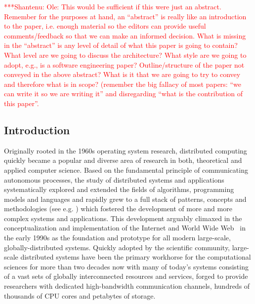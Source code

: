 \documentclass[a4paper,10pt]{article}
\newcommand{\jhanote}[1]{  {\textcolor{red}     { ***Shantenu: #1 }}}
\newcommand{\jhanote}[1]{}
\begin{document}
\jhanote{Ole: This would be sufficient if this were just an
  abstract. Remember for the purposes at hand, an ``abstract'' is
  really like an introduction to the paper, i.e. enough material so
  the editors can provide useful comments/feedback so that we can make
  an informed decision. What is missing in the ``abstract'' is any
  level of detail of what this paper is going to contain? What level
  are we going to discuss the architecture? What style are we going to
  adopt, e.g., is a software engineering paper?  Outline/structure of
  the paper not conveyed in the above abstract? What is it that we are
  going to try to convey and therefore what is in scope? (remember the
  big fallacy of most papers: ``we can write it so we are writing it''
  and disregarding ``what is the contribution of this paper''.}

 
\subsection*{Introduction}

 Originally rooted in the 1960s operating system research, distributed computing 
 quickly became a popular and diverse area of research in both, theoretical and applied 
 computer science. Based on the fundamental principle of communicating autonomous processes, 
 the study of distributed systems and applications systematically explored and extended the 
 fields of algorithms, programming models and languages and rapidly grew to a full stack of 
 patterns, concepts and methodologies (see e.g. \cite{519301}) which fostered the development 
 of more and more complex systems and applications. This development arguably climaxed in the  
 conceptualization and implementation of the Internet and World Wide Web~\cite{Berners-lee92world-wideweb} 
 in the early 1990s as the foundation and prototype for all modern large-scale, globally-distributed 
 systems. Quickly adopted by the scientific community, large-scale distributed systems have 
 been the primary workhorse for the computational sciences for more than two decades now 
 with many of today's systems consisting of a vast sets of globally interconnected resources 
 and services, forged to provide researchers with dedicated high-bandwidth communication 
 channels, hundreds of thousands of CPU cores and petabytes of storage.
 
\end{document}
